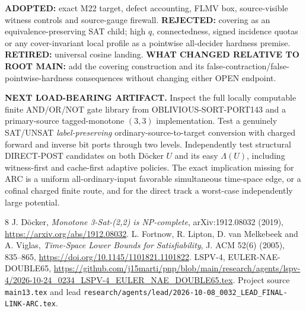 \documentclass[11pt]{article}
\begin{document}
\textbf{ADOPTED:} exact M22 target, defect accounting, FLMV box,
source-visible witness controls and source-gauge firewall.
\textbf{REJECTED:} covering as an equivalence-preserving SAT child;
high \(q\), connectedness, signed incidence quotas or any
cover-invariant local profile as a pointwise all-decider hardness
premise. \textbf{RETIRED:} universal cosine landing.
\textbf{WHAT CHANGED RELATIVE TO ROOT MAIN:} add the covering
construction and its false-contraction/false-pointwise-hardness
consequences without changing either OPEN endpoint.

\textbf{NEXT LOAD-BEARING ARTIFACT.} Inspect the full locally
computable finite AND/OR/NOT gate library from
OBLIVIOUS-SORT-PORT143 and a primary-source tagged-monotone
\((3,3)\) implementation. Test a genuinely SAT/UNSAT
\emph{label-preserving} ordinary-source-to-target conversion
with charged forward and inverse bit ports through two levels.
Independently test structural DIRECT-POST candidates on both
D\"ocker \(U\) and its easy \(\Lambda(U)\), including witness-first
and cache-first adaptive policies. The exact implication missing
for ARC is a uniform all-ordinary-input favorable simultaneous
time-space edge, or a cofinal charged finite route, and for the
direct track a worst-case independently large potential.

\begin{thebibliography}{8}
 J. D\"ocker, \emph{Monotone 3-Sat-(2,2) is NP-complete},
arXiv:1912.08032 (2019), \url{https://arxiv.org/abs/1912.08032}.
 L. Fortnow, R. Lipton, D. van Melkebeek and A. Viglas,
\emph{Time-Space Lower Bounds for Satisfiability},
J. ACM 52(6) (2005), 835--865,
\url{https://doi.org/10.1145/1101821.1101822}.
 LSPV-4, EULER-NAE-DOUBLE65,
\url{https://github.com/j15marti/pnp/blob/main/research/agents/lspv-4/2026-10-24_0234_LSPV-4_EULER_NAE_DOUBLE65.tex}.
 Project source \texttt{main13.tex} and lead
\texttt{research/agents/lead/2026-10-08\_0032\_LEAD\_FINAL-LINK-ARC.tex}.
\end{thebibliography}
\end{document}
